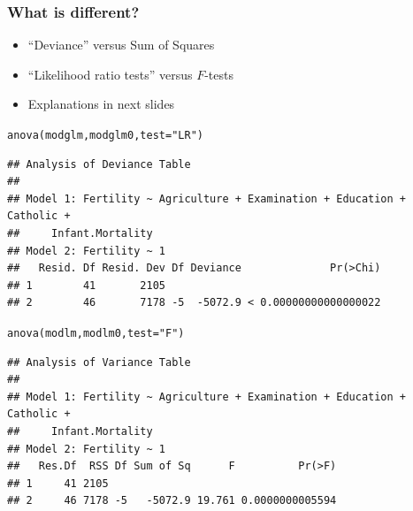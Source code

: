 \documentclass[extsize,handout,10pt]{beamer}\usepackage[]{graphicx}\usepackage[]{color}
\makeatletter
\newcommand{\hlstr}[1]{\textcolor[rgb]{1,0.4,0.2}{#1}}%
\newcommand{\hlstd}[1]{\textcolor[rgb]{0.251,0.251,0.251}{#1}}%
\newcommand{\hlkwc}[1]{\textcolor[rgb]{0.188,0.941,0.314}{#1}}%
\newcommand{\hlkwd}[1]{\textcolor[rgb]{0.69,0.188,0.941}{#1}}%
\newenvironment{kframe}{%
 \def\at@end@of@kframe{}%
 \ifinner\ifhmode%
  \def\at@end@of@kframe{\end{minipage}}%
  \begin{minipage}{\columnwidth}%
 \fi\fi%
 \def\FrameCommand##1{\hskip\@totalleftmargin \hskip-\fboxsep
 \colorbox{shadecolor}{##1}\hskip-\fboxsep
     \hskip-\linewidth \hskip-\@totalleftmargin \hskip\columnwidth}%
 \MakeFramed {\advance\hsize-\width
   \@totalleftmargin\z@ \linewidth\hsize
   \@setminipage}}%
 {\par\unskip\endMakeFramed%
 \at@end@of@kframe}
\newenvironment{knitrout}{}{} %
\makeatother
\begin{document}
\begin{frame}[fragile]
  \frametitle{What is different?}


    \begin{itemize}
    \item ``Deviance'' versus Sum of Squares
    \item ``Likelihood ratio tests'' versus $F$-tests
    \item Explanations in next slides
    \end{itemize}

\begin{knitrout}\tiny
{}\color{fgcolor}\begin{kframe}
\begin{alltt}
\hlkwd{anova}\hlstd{(modglm,modglm0,}\hlkwc{test}\hlstd{=}\hlstr{"LR"}\hlstd{)}
\end{alltt}
\begin{verbatim}
## Analysis of Deviance Table
## 
## Model 1: Fertility ~ Agriculture + Examination + Education + Catholic + 
##     Infant.Mortality
## Model 2: Fertility ~ 1
##   Resid. Df Resid. Dev Df Deviance              Pr(>Chi)
## 1        41       2105                                  
## 2        46       7178 -5  -5072.9 < 0.00000000000000022
\end{verbatim}
\begin{alltt}
\hlkwd{anova}\hlstd{(modlm,modlm0,}\hlkwc{test}\hlstd{=}\hlstr{"F"}\hlstd{)}
\end{alltt}
\begin{verbatim}
## Analysis of Variance Table
## 
## Model 1: Fertility ~ Agriculture + Examination + Education + Catholic + 
##     Infant.Mortality
## Model 2: Fertility ~ 1
##   Res.Df  RSS Df Sum of Sq      F          Pr(>F)
## 1     41 2105                                    
## 2     46 7178 -5   -5072.9 19.761 0.0000000005594
\end{verbatim}
\end{kframe}
\end{knitrout}
\end{frame}
\end{document}

